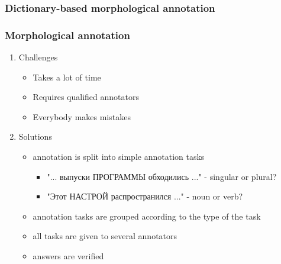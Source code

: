 \documentclass{beamer}
\begin{document}
\begin{frame}
\frametitle{Dictionary-based morphological annotation}
\begin{figure}
\end{figure}
\end{frame}


\begin{frame}
\frametitle{Morphological annotation}
\begin{enumerate}
\item{Challenges}
    \begin{itemize}
    \item{Takes a lot of time}
    \item{Requires qualified annotators}
    \item{Everybody makes mistakes}
    \end{itemize}
    \pause
\item{Solutions}
    \begin{itemize}
    \item{annotation is split into simple annotation tasks}
        \begin{itemize}
        \item{"... выпуски ПРОГРАММЫ обходились ..." - singular or plural?}
        \item{"Этот НАСТРОЙ распространился ..." - noun or verb?}
        \end{itemize}
    \item{annotation tasks are grouped according to the type of the task}
    \item{all tasks are given to several annotators}
    \item{answers are verified}
    \end{itemize}
\end{enumerate}
\end{frame}
\end{document}
